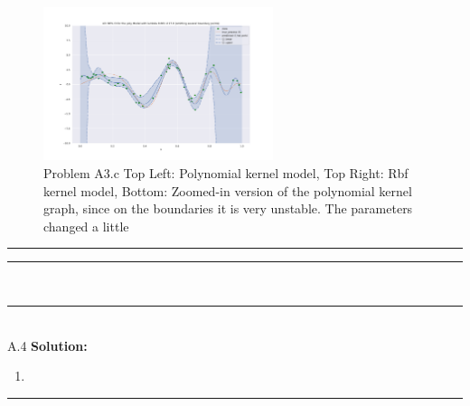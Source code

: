 \documentclass{article}
\newcommand{\1}{\mathbf{1}}
\begin{document}
\begin{enumerate}
\begin{figure}[h!]
            \includegraphics[width=0.6\textwidth]{hw3/code/figures/A3c_poly_zoomed.pdf}
            \caption{Problem A3.c Top Left: Polynomial kernel model, Top Right: Rbf kernel model, Bottom: Zoomed-in version of the polynomial kernel graph, since on the boundaries it is very unstable. The parameters changed a little }
            \label{figure:a4}
        \end{figure}
\end{enumerate}   
\noindent\rule{\textwidth}{1pt}

\noindent\rule{\textwidth}{1pt}
\\

\noindent\rule{\textwidth}{1pt}
\\
A.4 {\bf Solution:}\\
\begin{enumerate}
    \item 
\end{enumerate}   
\noindent\rule{\textwidth}{1pt}
\end{document}
